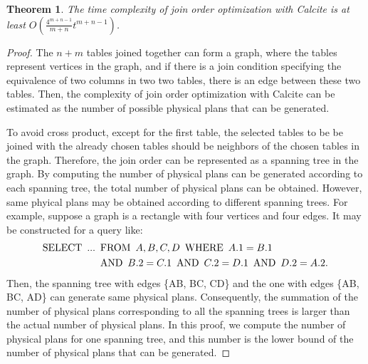 \documentclass[sigconf, nonacm]{acmart}
\newtheorem{theorem}{Theorem}
\begin{document}
\begin{theorem}
    \label{theorem:complexity-of-calcite}
    The time complexity of join order optimization with Calcite is at least $O(\frac{4^{m+n-1}}{m+n}t^{m+n-1})$.
\end{theorem}
\begin{proof}
    The $n + m$ tables joined together can form a graph, where the tables represent vertices in the graph, and if there is a join condition specifying the equivalence of two columns in two two tables, there is an edge between these two tables.
    Then, the complexity of join order optimization with Calcite can be estimated as the number of possible physical plans that can be generated.
    
    To avoid cross product, except for the first table, the selected tables to be be joined with the already chosen tables should be neighbors of the chosen tables in the graph.
    Therefore, the join order can be represented as a spanning tree in the graph.
    By computing the number of physical plans can be generated according to each spanning tree, the total number of physical plans can be obtained.
    However, same phyical plans may be obtained according to different spanning trees.
    For example, suppose a graph is a rectangle with four vertices and four edges.
    It may be constructed for a query like:
    \begin{equation*}
        \begin{split}
            \text{SELECT}\hspace{.5em} ... & \hspace{.5em}\text{FROM}\hspace{.5em} A, B, C, D \hspace{.5em}\text{WHERE}\hspace{.5em} A.1 = B.1 \\ 
            & \hspace{.5em}\text{AND}\hspace{.5em} B.2 = C.1 \hspace{.5em}\text{AND}\hspace{.5em} C.2 = D.1 \hspace{.5em}\text{AND}\hspace{.5em} D.2 = A.2. 
        \end{split}
    \end{equation*}
    Then, the spanning tree with edges \{AB, BC, CD\} and the one with edges \{AB, BC, AD\} can generate same physical plans.
    Consequently, the summation of the number of physical plans corresponding to all the spanning trees is larger than the actual number of physical plans.
    In this proof, we compute the number of physical plans for one spanning tree, and this number is the lower bound of the number of physical plans that can be generated.


\end{proof}
\end{document}
